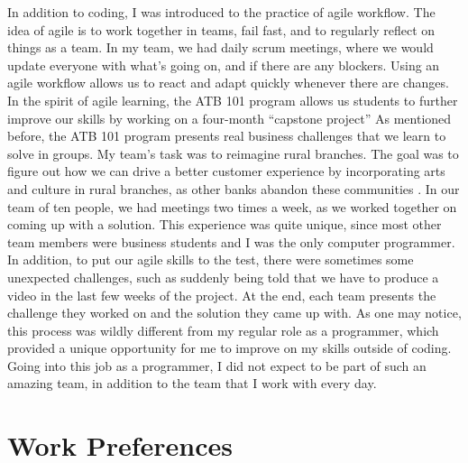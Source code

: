 \documentclass[letterpaper,12pt]{article}
\begin{document}
In addition to coding, I was introduced to the practice of agile workflow. The idea of agile is to work together
in teams, fail fast, and to regularly reflect on things as a team.\cite{agile}
In my team, we had daily scrum meetings, where we would update everyone with
what's going on, and if there are any blockers. Using an agile workflow allows us to react and adapt
quickly whenever there are changes. In the spirit of agile learning, the ATB 101
program allows us students to further improve our skills by working on a four-month ``capstone project''
As mentioned before, the ATB 101 program presents real business challenges that we learn to
solve in groups. My team's task was to reimagine rural branches. The goal was to figure out
how we can drive a better customer experience by incorporating arts and culture in rural branches,
as other banks abandon these communities \cite{saskbranches}. In our team of ten people,
we had meetings two times a week, as we worked together on coming up with a solution.
This experience was quite unique, since most other team members were business students and
I was the only computer programmer. In addition, to put our agile skills to the test,
there were sometimes some unexpected challenges, such as suddenly being told that we have to produce
a video in the last few weeks of the project.
At the end, each team presents the challenge they worked on and the solution they came up with.
As one may notice, this process was wildly different from my regular role as a programmer, which
provided a unique opportunity for me to improve on my skills outside of coding. Going into
this job as a programmer, I did not expect to be part of such an amazing team, in addition to
the team that I work with every day.



\section{Work Preferences}
\end{document}
